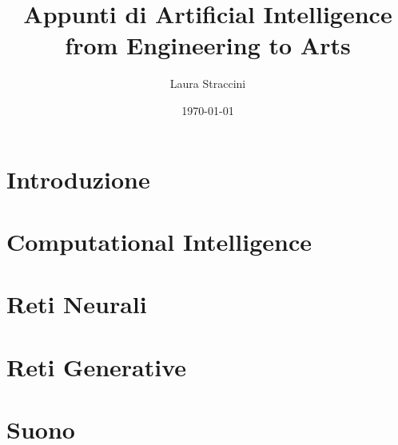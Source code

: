 \documentclass[oneside]{book}
\title{Appunti di Artificial Intelligence from Engineering to Arts}
\author{Laura Straccini}
\date{\today}
\begin{document}
\frontmatter
\maketitle %
\tableofcontents %

\mainmatter

\chapter{Introduzione}

\chapter{Computational Intelligence}


\chapter{Reti Neurali}


\chapter{Reti Generative}



\chapter{Suono}

\end{document}
